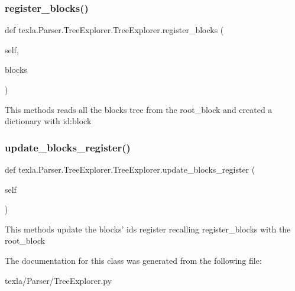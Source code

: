 \subsubsection{\texorpdfstring{register\+\_\+blocks()}{register\_blocks()}}
{\footnotesize\ttfamily def texla.\+Parser.\+Tree\+Explorer.\+Tree\+Explorer.\+register\+\_\+blocks (\begin{DoxyParamCaption}\item[{}]{self,  }\item[{}]{blocks }\end{DoxyParamCaption})}

\begin{DoxyVerb}This methods reads all the blocks tree
from the root_block and created a dictionary
with id:block\end{DoxyVerb}
 \hypertarget{classtexla_1_1Parser_1_1TreeExplorer_1_1TreeExplorer_a920a80c8a3e38a5144641b688938ad8d}{}\label{classtexla_1_1Parser_1_1TreeExplorer_1_1TreeExplorer_a920a80c8a3e38a5144641b688938ad8d} 
\subsubsection{\texorpdfstring{update\+\_\+blocks\+\_\+register()}{update\_blocks\_register()}}
{\footnotesize\ttfamily def texla.\+Parser.\+Tree\+Explorer.\+Tree\+Explorer.\+update\+\_\+blocks\+\_\+register (\begin{DoxyParamCaption}\item[{}]{self }\end{DoxyParamCaption})}

\begin{DoxyVerb}This methods update the blocks' ids register
recalling register_blocks with the root_block\end{DoxyVerb}
 

The documentation for this class was generated from the following file\+:\begin{DoxyCompactItemize}
\item 
texla/\+Parser/Tree\+Explorer.\+py\end{DoxyCompactItemize}
